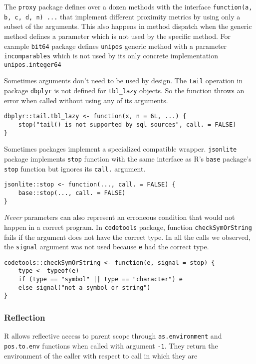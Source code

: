 \documentclass[screen,acmsmall]{acmart}
\newcommand{\never}{\emph{Never}\xspace}
\newcommand{\code}[1]{\lstinline[style=R]|#1|\xspace}
\begin{document}
The \code{proxy} package defines over a dozen methods with the interface
\code{function(a, b, c, d, n) ...} that implement different proximity metrics by
using only a subset of the arguments.
This also happens in method dispatch when the generic method defines a parameter
which is not used by the specific method. For example \code{bit64} package
defines \code{unipos} generic method with a parameter \code{incomparables} which
is not used by its only concrete implementation \code{unipos.integer64}


Sometimes arguments don't need to be used by design.
The \code{tail} operation in package \code{dbplyr} is not defined for
\code{tbl_lazy} objects. So the function throws an error when called without
using any of its arguments.
\begin{lstlisting}
dbplyr::tail.tbl_lazy <- function(x, n = 6L, ...) {
    stop("tail() is not supported by sql sources", call. = FALSE)
}
\end{lstlisting}

Sometimes packages implement a specialized compatible wrapper.
\code{jsonlite} package implements \code{stop} function with the same interface
as R's \code{base} package's \code{stop} function but ignores its \code{call.}
argument.
\begin{lstlisting}
jsonlite::stop <- function(..., call. = FALSE) {
    base::stop(..., call. = FALSE)
}
\end{lstlisting}

\never parameters can also represent an erroneous condition that would not
happen in a correct program. In \code{codetools} package, function
\code{checkSymOrString} fails if the argument does not have the correct type. In
all the calls we observed, the \code{signal} argument was not used because
\code{e} had the correct type.
\begin{lstlisting}
codetools::checkSymOrString <- function(e, signal = stop) {
    type <- typeof(e)
    if (type == "symbol" || type == "character") e
    else signal("not a symbol or string")
}
\end{lstlisting}

\subsubsection{Reflection}

R allows reflective access to parent scope through \code{as.environment} and
\code{pos.to.env} functions when called with argument \code{-1}.
They return the environment of the caller with respect to call in which they are
\end{document}
